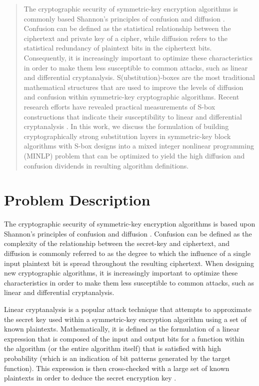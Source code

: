 \documentclass[11pt]{article}
\begin{document}

\begin{abstract}
The cryptographic security of symmetric-key encryption algorithms is commonly based Shannon's principles of confusion and diffusion \cite{Kim90astudy}. Confusion can be defined as the statistical relationship between the ciphertext and private key of a cipher, while diffusion refers to the statistical redundancy of plaintext bits in the ciphertext bits. Consequently, it is increasingly important to optimize these characteristics in order to make them less susceptible to common attacks, such as linear and differential cryptanalysis. S(ubstitution)-boxes are the most traditional mathematical structures that are used to improve the levels of diffusion and confusion within symmetric-key cryptographic algorithms. Recent research efforts have revealed practical measurements of S-box constructions that indicate their susceptibility to linear and differential cryptanalysis \cite{Kim90astudy}. In this work, we discuss the formulation of building cryptographically strong substitution layers in symmetric-key block algorithms with S-box designs into a mixed integer nonlinear programming (MINLP) problem that can be optimized to yield the high diffusion and confusion dividends in resulting algorithm definitions.
\end{abstract}

\section{Problem Description}
The cryptographic security of symmetric-key encryption algorithms is based upon Shannon's principles of confusion and diffusion \cite{Kim90astudy}. Confusion can be defined as the complexity of the relationship between the secret-key and ciphertext, and diffusion is commonly referred to as the degree to which the influence of a single input plaintext bit is spread throughout the resulting ciphertext. When designing new cryptographic algorithms, it is increasingly important to optimize these characteristics in order to make them less susceptible to common attacks, such as linear and differential cryptanalysis.

Linear cryptanalysis is a popular attack technique that attempts to approximate the secret key used within a symmetric-key encryption algorithm using a set of known plaintexts. Mathematically, it is defined as the formulation of a linear expression that is composed of the input and output bits for a function within the algorithm (or the entire algorithm itself) that is satisfied with high probability (which is an indication of bit patterns generated by the target function). This expression is then cross-checked with a large set of known plaintexts in order to deduce the secret encryption key \cite{Heys01atutorial}.
\end{document}
